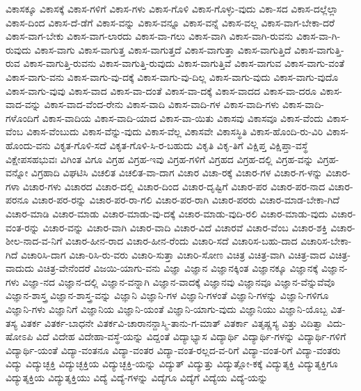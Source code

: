 {ವಿಕಾಸಕ್ಕೂ
ವಿಕಾಸಕ್ಕೆ
ವಿಕಾಸ-ಗಳಿಗೆ
ವಿಕಾಸ-ಗಳು
ವಿಕಾಸ-ಗೊಳಿ
ವಿಕಾಸ-ಗೊಳ್ಳು-ವುದು
ವಿಕಾ-ಸದ
ವಿಕಾಸ-ದಲ್ಲೆಲ್ಲಾ
ವಿಕಾಸ-ದಿಂದ
ವಿಕಾಸ-ದೆ-ಡೆಗೆ
ವಿಕಾಸ-ವನ್ನು
ವಿಕಾಸ-ವನ್ನೂ
ವಿಕಾಸ-ವನ್ನೆ
ವಿಕಾಸ-ವಲ್ಲ
ವಿಕಾಸ-ವಾಗ-ಬೇಕಾ-ದರೆ
ವಿಕಾಸ-ವಾಗ-ಬೇಕು
ವಿಕಾಸ-ವಾಗ-ಲಾರದು
ವಿಕಾಸ-ವಾ-ಗಲು
ವಿಕಾಸ-ವಾಗಿ
ವಿಕಾಸ-ವಾಗಿ-ರುವನು
ವಿಕಾಸ-ವಾ-ಗಿ-ರುವುದು
ವಿಕಾಸ-ವಾಗು
ವಿಕಾಸ-ವಾಗುತ್ತ
ವಿಕಾಸ-ವಾಗುತ್ತದೆ
ವಿಕಾಸ-ವಾಗುತ್ತಾ
ವಿಕಾಸ-ವಾಗುತ್ತಿದೆ
ವಿಕಾಸ-ವಾಗುತ್ತಿ-ರುವ
ವಿಕಾಸ-ವಾಗುತ್ತಿ-ರುವನು
ವಿಕಾಸ-ವಾಗುತ್ತಿ-ರುವುದು
ವಿಕಾಸ-ವಾಗುತ್ತಿವೆ
ವಿಕಾಸ-ವಾಗುವ
ವಿಕಾಸ-ವಾಗು-ವಂತೆ
ವಿಕಾಸ-ವಾಗು-ವನು
ವಿಕಾಸ-ವಾಗು-ವು-ದಕ್ಕೆ
ವಿಕಾಸ-ವಾಗು-ವು-ದಿಲ್ಲ
ವಿಕಾಸ-ವಾಗು-ವುದು
ವಿಕಾಸ-ವಾಗು-ವುದೊ
ವಿಕಾಸ-ವಾಗು-ವುವು
ವಿಕಾಸ-ವಾದ
ವಿಕಾಸ-ವಾ-ದಂತೆ
ವಿಕಾಸ-ವಾ-ದಕ್ಕೆ
ವಿಕಾಸ-ವಾದದ
ವಿಕಾಸ-ವಾ-ದರೂ
ವಿಕಾಸ-ವಾದ-ವನ್ನು
ವಿಕಾಸ-ವಾದ-ವೆಂದ-ರೇನು
ವಿಕಾಸ-ವಾದಿ
ವಿಕಾಸ-ವಾದಿ-ಗಳ
ವಿಕಾಸ-ವಾದಿ-ಗಳು
ವಿಕಾಸ-ವಾದಿ-ಗಳೊಂದಿಗೆ
ವಿಕಾಸ-ವಾದಿಯ
ವಿಕಾಸ-ವಾದಿ-ಯಾದ
ವಿಕಾಸ-ವಾ-ಯಿತು
ವಿಕಾಸವು
ವಿಕಾಸವೂ
ವಿಕಾಸ-ವೆಂದು
ವಿಕಾಸ-ವೆಂಬ
ವಿಕಾಸ-ವೆಂಬುದು
ವಿಕಾಸ-ವೆನ್ನು-ವುದು
ವಿಕಾಸ-ವೆಲ್ಲ
ವಿಕಾಸವೇ
ವಿಕಾಸಸ್ಥಿತಿ
ವಿಕಾಸ-ಹೊಂದಿ-ರು-ವಿರಿ
ವಿಕಾಸ-ಹೊಂದು-ವನು
ವಿಕೃತ-ಗೊಳಿ-ಸದೆ
ವಿಕೃತ-ಗೊಳಿ-ಸಿ-ರ-ಬಹುದು
ವಿಕೃತಿ
ವಿಕೃ-ತಿಗೆ
ವಿಕ್ಷಿಪ್ತ
ವಿಕ್ಷಿಪ್ತಾ-ವಸ್ಥೆ
ವಿಕ್ಷೇಪಸಹಭುವಃ
ವಿಗಿಂತ
ವಿಗೂ
ವಿಗ್ರಹ
ವಿಗ್ರಹ-ಇವು
ವಿಗ್ರಹ-ಗಳಿಗೆ
ವಿಗ್ರಹದ
ವಿಗ್ರಹ-ದಲ್ಲಿ
ವಿಗ್ರಹ-ವನ್ನು
ವಿಗ್ರಹ-ವನ್ನೋ
ವಿಗ್ರಹಾದಿ
ವಿಘಟಿಸಿ
ವಿಚಲಿತ
ವಿಚಲಿತ-ವಾ-ದಾಗ
ವಿಚಾರ
ವಿಚಾ-ರಕ್ಕೆ
ವಿಚಾರ-ಗಳ
ವಿಚಾರ-ಗ-ಳನ್ನು
ವಿಚಾರ-ಗಳಾ
ವಿಚಾರ-ಗಳು
ವಿಚಾರದ
ವಿಚಾರ-ದಲ್ಲಿ
ವಿಚಾರ-ದಿಂದ
ವಿಚಾರ-ದೃಷ್ಟಿಗೆ
ವಿಚಾರ-ಪರ
ವಿಚಾರ-ಪರ-ನಾದ
ವಿಚಾರ-ಪರನೂ
ವಿಚಾರ-ಪರ-ರನ್ನು
ವಿಚಾರ-ಪರ-ರಾ-ಗಲಿ
ವಿಚಾರ-ಪರ-ರಾಗಿ
ವಿಚಾರ-ಪರರು
ವಿಚಾರ-ಮಾಡ-ಬೇಕಾ-ಗಿದೆ
ವಿಚಾರ-ಮಾಡಿ
ವಿಚಾರ-ಮಾಡು
ವಿಚಾರ-ಮಾಡು-ವು-ದಕ್ಕೆ
ವಿಚಾರ-ಮಾಡು-ವುದಿ-ರಲಿ
ವಿಚಾರ-ಮಾಡು-ವುದು
ವಿಚಾರ-ವಂತ-ರನ್ನು
ವಿಚಾರ-ವನ್ನು
ವಿಚಾರ-ವಾಗಿ
ವಿಚಾರ-ವಾದಿ
ವಿಚಾರ-ವಿದೆ
ವಿಚಾರವೆ
ವಿಚಾರ-ವೆಂಬ
ವಿಚಾರ-ಶಕ್ತಿ
ವಿಚಾರ-ಶೀಲ-ನಾದ-ವ-ನಿಗೆ
ವಿಚಾರ-ಹೀನ-ರಾದ
ವಿಚಾರ-ಹೀನ-ರೆಂದು
ವಿಚಾರಿ-ಸದೆ
ವಿಚಾರಿಸ-ಬಹು-ದಾದ
ವಿಚಾರಿಸ-ಬೇಕಾ-ಗಿದೆ
ವಿಚಾರಿಸಿ-ದಾಗ
ವಿಚಾ-ರಿಸಿ-ರು-ವರು
ವಿಚಾರಿ-ಸುತ್ತಾ
ವಿಚಾರಿ-ಸೋಣ
ವಿಚಿತ್ರ
ವಿಚಿತ್ರ-ವಾಗಿ
ವಿಚಿತ್ರ-ವಾದ
ವಿಚಿತ್ರ-ವಾದುದು
ವಿಚಿತ್ರ-ವೇನೆಂದರೆ
ವಿಜಯಿ-ಯಾಗು-ವನು
ವಿಜ್ಞಾ
ವಿಜ್ಞಾನ
ವಿಜ್ಞಾನಕ್ಕಿಂತ
ವಿಜ್ಞಾನಕ್ಕೂ
ವಿಜ್ಞಾನಕ್ಕೆ
ವಿಜ್ಞಾನ-ಗಳು
ವಿಜ್ಞಾ-ನದ
ವಿಜ್ಞಾನ-ದಲ್ಲಿ
ವಿಜ್ಞಾನ-ವನ್ನಾಗಿ
ವಿಜ್ಞಾನ-ವಾದಕ್ಕೆ
ವಿಜ್ಞಾನವು
ವಿಜ್ಞಾನವೂ
ವಿಜ್ಞಾನ-ವೆನ್ನುವೆವೊ
ವಿಜ್ಞಾನ-ಶಾಸ್ತ್ರ
ವಿಜ್ಞಾನ-ಶಾಸ್ತ್ರ-ವನ್ನು
ವಿಜ್ಞಾನಿ
ವಿಜ್ಞಾನಿ-ಗಳ
ವಿಜ್ಞಾನಿ-ಗಳಂತೆ
ವಿಜ್ಞಾನಿ-ಗಳನ್ನು
ವಿಜ್ಞಾನಿ-ಗಳಿಗೂ
ವಿಜ್ಞಾನಿ-ಗಳು
ವಿಜ್ಞಾನಿಗೆ
ವಿಜ್ಞಾನಿಯ
ವಿಜ್ಞಾನಿ-ಯಂತೆ
ವಿಜ್ಞಾನಿ-ಯಾಗು-ವುದು
ವಿಜ್ಞಾನಿಯು
ವಿಜ್ಞಾನಿ-ಯೊಬ್ಬ
ವಿತ-ತಸ್ಯ
ವಿತರ್ಕ
ವಿತರ್ಕ-ಬಾಧನೇ
ವಿತರ್ಕವಿ-ಚಾರಾನನ್ದಾಸ್ಮಿ-ತಾನು-ಗ-ಮಾತ್
ವಿತರ್ಕಾ
ವಿತೃಷ್ಣಸ್ಯ
ವಿತ್ತು
ವಿದಿತ್ವಾ
ವಿದು-ಷೋಽಪಿ
ವಿದೆ
ವಿದೇಹ
ವಿದೇಹಾ-ವಸ್ಥೆ-ಯನ್ನು
ವಿದ್ದಂತೆ
ವಿದ್ಯಾಭ್ಯಾಸ
ವಿದ್ಯಾರ್ಥಿ
ವಿದ್ಯಾರ್ಥಿ-ಗಳನ್ನು
ವಿದ್ಯಾರ್ಥಿ-ಗಳಿಗೆ
ವಿದ್ಯಾರ್ಥಿ-ಯಂತೆ
ವಿದ್ಯಾ-ವಂತನೂ
ವಿದ್ಯಾ-ವಂತರ
ವಿದ್ಯಾ-ವಂತ-ರಲ್ಲದ-ವ-ರಿಗೆ
ವಿದ್ಯಾ-ವಂತ-ರಿಗೆ
ವಿದ್ಯಾ-ವಂತರು
ವಿದ್ಯು
ವಿದ್ಯುಚ್ಛಕ್ತಿ
ವಿದ್ಯುಚ್ಛಕ್ತಿಯ
ವಿದ್ಯುಚ್ಛಕ್ತಿ-ಯನ್ನು
ವಿದ್ಯುತ್
ವಿದ್ಯುತ್ತು
ವಿದ್ಯುತ್ಲೋ-ಕಕ್ಕೆ
ವಿದ್ಯುತ್ಶಕ್ತಿ
ವಿದ್ಯುತ್ಶಕ್ತಿಗೂ
ವಿದ್ಯುತ್ಶಕ್ತಿಯ
ವಿದ್ಯುತ್ಶಕ್ತಿಯು
ವಿದ್ಯೆ
ವಿದ್ಯೆ-ಗಳನ್ನು
ವಿದ್ಯೆಗೂ
ವಿದ್ಯೆಗೆ
ವಿದ್ಯೆಯ
ವಿದ್ಯೆ-ಯನ್ನು
}
